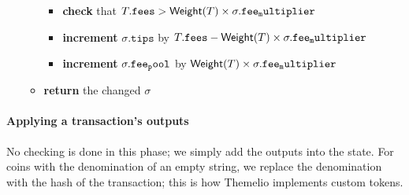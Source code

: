 \documentclass[
]{article}
\providecommand{\tightlist}{%
  \setlength{\itemsep}{0pt}\setlength{\parskip}{0pt}}
\begin{document}
\begin{itemize}
\begin{itemize}
                \begin{itemize}
                  \tightlist
                  \item
                        \textbf{check} that
                        \(T.\mathtt{fees} > \mathsf{Weight}(T)\times\sigma.\mathtt{fee\\_multiplier}\)
                  \item
                        \textbf{increment} \(\sigma.\mathtt{tips}\) by
                        \(T.\mathtt{fees} - \mathsf{Weight}(T)\times\sigma.\mathtt{fee\\_multiplier}\)
                  \item
                        \textbf{increment} \(\sigma.\mathtt{fee\\_pool}\) by
                        \(\mathsf{Weight}(T)\times\sigma.\mathtt{fee\\_multiplier}\)
                \end{itemize}
          \item
                \textbf{return} the changed \(\sigma\)
        \end{itemize}
\end{itemize}

\hypertarget{applying-a-transactions-outputs}{%
  \paragraph{Applying a transaction's
    outputs}\label{applying-a-transactions-outputs}}

No checking is done in this phase; we simply add the outputs into the
state. For coins with the denomination of an empty string, we replace
the denomination with the hash of the transaction; this is how Themelio
implements custom tokens.
\end{document}
